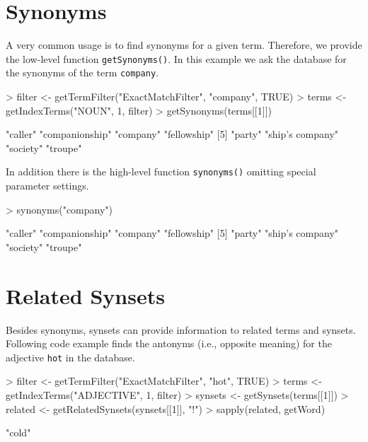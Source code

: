 \documentclass[a4paper]{article}
\newcommand{\code}[1]{\mbox{\texttt{#1}}}
\begin{document}
\section*{Synonyms}
A very common usage is to find synonyms for a given term. Therefore,
we provide the low-level function \code{getSynonyms()}. In this example
we ask the database for the synonyms of the term \code{company}.
\begin{Schunk}
\begin{Sinput}
> filter <- getTermFilter("ExactMatchFilter", "company", TRUE)
> terms <- getIndexTerms("NOUN", 1, filter)
> getSynonyms(terms[[1]])
\end{Sinput}
\end{Schunk}
\begin{Soutput}
[1] "caller"     "companionship"   "company"   "fellowship"
[5] "party"      "ship's company"   "society"   "troupe"
\end{Soutput}
In addition there is the high-level function \code{synonyms()}
omitting special parameter settings.
\begin{Schunk}
\begin{Sinput}
> synonyms("company")
\end{Sinput}
\end{Schunk}
\begin{Soutput}
[1] "caller"     "companionship"   "company"   "fellowship"
[5] "party"      "ship's company"   "society"   "troupe"
\end{Soutput}

\section*{Related Synsets}
Besides synonyms, synsets can provide information to related terms and
synsets. Following code example finds the antonyms (i.e., opposite
meaning) for the adjective \code{hot} in the database.
\begin{Schunk}
\begin{Sinput}
> filter <- getTermFilter("ExactMatchFilter", "hot", TRUE)
> terms <- getIndexTerms("ADJECTIVE", 1, filter)
> synsets <- getSynsets(terms[[1]])
> related <- getRelatedSynsets(synsets[[1]], "!")
> sapply(related, getWord)
\end{Sinput}
\end{Schunk}
\begin{Soutput}
[1] "cold"
\end{Soutput}
\end{document}
